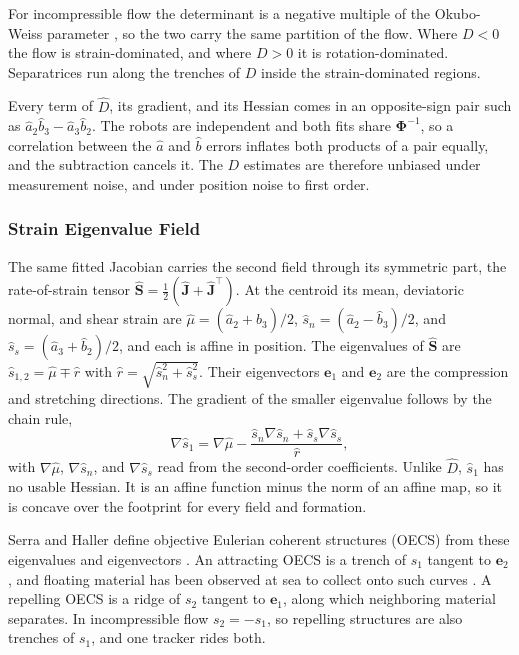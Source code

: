\documentclass[lettersize,journal]{IEEEtran}
\begin{document}
For incompressible flow the determinant is a negative multiple of the
Okubo-Weiss parameter \cite{21,22}, so the two carry the same partition of
the flow. Where $D < 0$ the flow is strain-dominated, and where $D > 0$
it is rotation-dominated. Separatrices run along the trenches of $D$
inside the strain-dominated regions.

Every term of $\hat{D}$, its gradient, and its Hessian comes in an
opposite-sign pair such as $\hat{a}_2\hat{b}_3 - \hat{a}_3\hat{b}_2$.
The robots are independent and both fits share
$\boldsymbol{\Phi}^{-1}$, so a correlation between the $\hat{a}$ and
$\hat{b}$ errors inflates both products of a pair equally, and the
subtraction cancels it. The $D$ estimates are therefore unbiased under
measurement noise, and under position noise to first order.

\subsubsection{Strain Eigenvalue Field}
The same fitted Jacobian carries the second field through its symmetric
part, the rate-of-strain tensor
$\hat{\mathbf{S}} = \tfrac{1}{2}(\hat{\mathbf{J}} + \hat{\mathbf{J}}^{\top})$.
At the centroid its mean, deviatoric normal, and shear strain are
$\hat{\mu} = (\hat{a}_2 + \hat{b}_3)/2$,
$\hat{s}_n = (\hat{a}_2 - \hat{b}_3)/2$, and
$\hat{s}_s = (\hat{a}_3 + \hat{b}_2)/2$, and each is affine in position.
The eigenvalues of $\hat{\mathbf{S}}$ are
$\hat{s}_{1,2} = \hat{\mu} \mp \hat{r}$ with
$\hat{r} = \sqrt{\hat{s}_n^2 + \hat{s}_s^2}$. Their eigenvectors
$\mathbf{e}_1$ and $\mathbf{e}_2$ are the compression and stretching
directions. The gradient of the smaller eigenvalue follows by the chain
rule,
\begin{equation}
    \nabla\hat{s}_1 = \nabla\hat{\mu}
        - \frac{\hat{s}_n\nabla\hat{s}_n + \hat{s}_s\nabla\hat{s}_s}{\hat{r}},
    \label{eq:grad_s1}
\end{equation}
with $\nabla\hat{\mu}$, $\nabla\hat{s}_n$, and $\nabla\hat{s}_s$ read
from the second-order coefficients. Unlike $\hat{D}$, $\hat{s}_1$ has no
usable Hessian. It is an affine function minus the norm of an affine
map, so it is concave over the footprint for every field and formation.

Serra and Haller define objective Eulerian coherent structures (OECS)
from these eigenvalues and eigenvectors \cite{17}. An attracting OECS is a
trench of $s_1$ tangent to $\mathbf{e}_2$, and floating material has been
observed at sea to collect onto such curves \cite{10}. A repelling OECS is a
ridge of $s_2$ tangent to $\mathbf{e}_1$, along which neighboring
material separates. In incompressible flow $s_2 = -s_1$, so repelling
structures are also trenches of $s_1$, and one tracker rides both.
\end{document}
